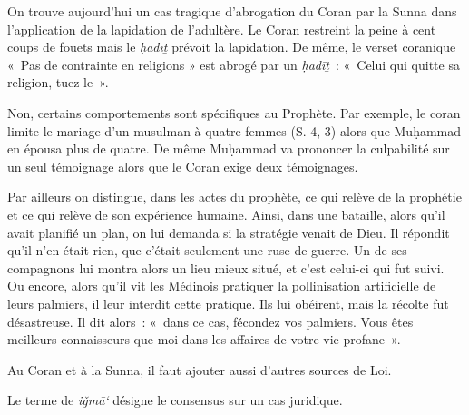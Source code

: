 On trouve aujourd'hui un cas tragique d'abrogation du Coran par la Sunna
dans l'application de la lapidation de l'adultère. Le Coran restreint la
peine à cent coups de fouets mais le \emph{ḥadīṯ} prévoit la lapidation.
De même, le verset coranique «~Pas de contrainte en religions » est
abrogé par un \emph{ḥadīṯ}~: «~Celui qui quitte sa religion, tuez-le~».


Non, certains comportements sont spécifiques au Prophète. Par exemple,
le coran limite le mariage d'un musulman à quatre femmes (S. 4, 3) alors
que Muḥammad en épousa plus de quatre. De même Muḥammad va prononcer la
culpabilité sur un seul témoignage alors que le Coran exige deux
témoignages.

Par ailleurs on distingue, dans les actes du prophète, ce qui relève de
la prophétie et ce qui relève de son expérience humaine. Ainsi, dans une
bataille, alors qu'il avait planifié un plan, on lui demanda si la
stratégie venait de Dieu. Il répondit qu'il n'en était rien, que c'était
seulement une ruse de guerre. Un de ses compagnons lui montra alors un
lieu mieux situé, et c'est celui-ci qui fut suivi. Ou encore, alors
qu'il vit les Médinois pratiquer la pollinisation artificielle de leurs
palmiers, il leur interdit cette pratique. Ils lui obéirent, mais la
récolte fut désastreuse. Il dit alors~: «~dans ce cas, fécondez vos
palmiers. Vous êtes meilleurs connaisseurs que moi dans les affaires de
votre vie profane~».

Au Coran et à la Sunna, il faut ajouter aussi d'autres sources de Loi.


\begin{Def}[{iǧmā`}]
Le terme de \emph{iǧmā`} désigne le consensus sur un cas juridique.
\end{Def}


